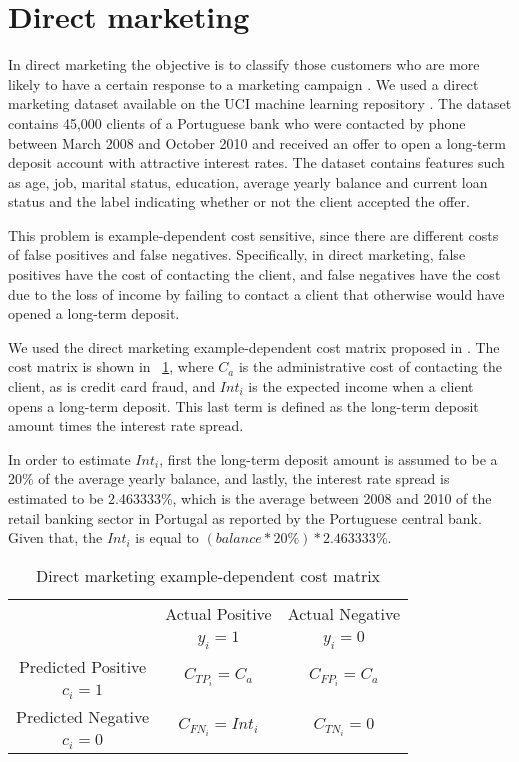 \section{Direct marketing}
\label{sec:5:directmarketing}

In direct marketing the objective is to classify those customers who are more likely to have a 
certain response to a marketing campaign \citep{Ngai2009}. We used a direct marketing dataset 
\citep{Moro2011} available on the UCI machine learning repository \citep{UCI2013}. The dataset 
contains 45,000 clients of a Portuguese bank who were contacted by phone between March 2008 and 
October 2010 and received an offer to open a long-term deposit account with attractive interest 
rates.  The dataset contains features such as age, job, marital status, education, average yearly 
balance and current loan status and the label indicating whether or not the client accepted 
the offer.

This problem is example-dependent cost sensitive, since there are different costs of false 
positives and false negatives. Specifically, in direct marketing, false positives have the cost 
of contacting the client, and false negatives have the cost due to the loss of income by failing 
to contact a client that otherwise would have opened a long-term deposit. 
  
We used the direct marketing example-dependent cost matrix proposed in \citep{CorreaBahnsen2014}. 
The cost matrix is shown in \mbox{\tablename{ \ref{tab:5:d_mat}}}, where $C_a$ is the 
administrative cost of contacting the client, as is credit card fraud,  and $Int_i$ is the expected 
income when a client opens a long-term deposit. This last term is defined as the long-term deposit 
amount times the interest rate spread.
 
In order to estimate $Int_i$, first the long-term deposit amount is assumed to be a 20\% of the 
average yearly balance, and lastly, the interest rate spread is estimated to be 2.463333\%,	which 
is the average between 2008 and 2010 of the retail banking sector in Portugal as reported by the 
Portuguese central bank. Given that, the $Int_i$ is equal to $\left( balance * 20\% \right) * 
2.463333\%$.

\begin{table}[!t]
  \centering
  \footnotesize
  \begin{tabular}{c|c|c}
    \multicolumn{1}{c|}{}  & Actual Positive& Actual Negative \\
    \multicolumn{1}{c|}{} & $y_i=1$& $y_i=0$ \\
    \hline
    Predicted Positive    & \multirow{ 2}{*}{$C_{TP_i}=C_a$} & \multirow{ 2}{*}{$C_{FP_i}=C_a$} 
    \\
    $c_i=1$ & &\\
    \hline
    Predicted Negative    & \multirow{ 2}{*}{$C_{FN_i}=Int_i$} & \multirow{ 2}{*}{$C_{TN_i}=0$} 
    \\
    $c_i=0$ & &\\
  \end{tabular}
  \caption{Direct marketing example-dependent cost matrix}
  \label{tab:5:d_mat}
\end{table}